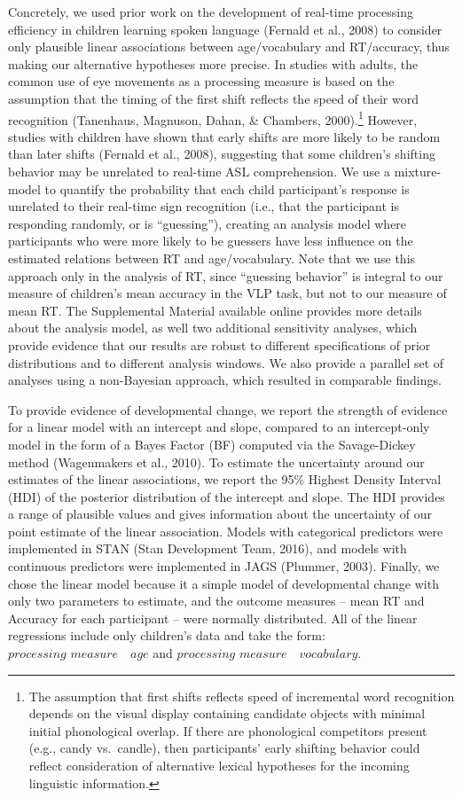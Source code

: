 \documentclass[oneside]{report}
\begin{document}
Concretely, we used prior work on the development of real-time
processing efficiency in children learning spoken language (Fernald et
al., 2008) to consider only plausible linear associations between
age/vocabulary and RT/accuracy, thus making our alternative hypotheses
more precise. In studies with adults, the common use of eye movements as
a processing measure is based on the assumption that the timing of the
first shift reflects the speed of their word recognition (Tanenhaus,
Magnuson, Dahan, \& Chambers, 2000).\footnote{The assumption that first
  shifts reflects speed of incremental word recognition depends on the
  visual display containing candidate objects with minimal initial
  phonological overlap. If there are phonological competitors present
  (e.g., candy vs.~candle), then participants' early shifting behavior
  could reflect consideration of alternative lexical hypotheses for the
  incoming linguistic information.} However, studies with children have
shown that early shifts are more likely to be random than later shifts
(Fernald et al., 2008), suggesting that some children's shifting
behavior may be unrelated to real-time ASL comprehension. We use a
mixture-model to quantify the probability that each child participant's
response is unrelated to their real-time sign recognition (i.e., that
the participant is responding randomly, or is ``guessing''), creating an
analysis model where participants who were more likely to be guessers
have less influence on the estimated relations between RT and
age/vocabulary. Note that we use this approach only in the analysis of
RT, since ``guessing behavior'' is integral to our measure of children's
mean accuracy in the VLP task, but not to our measure of mean RT. The
Supplemental Material available online provides more details about the
analysis model, as well two additional sensitivity analyses, which
provide evidence that our results are robust to different specifications
of prior distributions and to different analysis windows. We also
provide a parallel set of analyses using a non-Bayesian approach, which
resulted in comparable findings.

To provide evidence of developmental change, we report the strength of
evidence for a linear model with an intercept and slope, compared to an
intercept-only model in the form of a Bayes Factor (BF) computed via the
Savage-Dickey method (Wagenmakers et al., 2010). To estimate the
uncertainty around our estimates of the linear associations, we report
the 95\% Highest Density Interval (HDI) of the posterior distribution of
the intercept and slope. The HDI provides a range of plausible values
and gives information about the uncertainty of our point estimate of the
linear association. Models with categorical predictors were implemented
in STAN (Stan Development Team, 2016), and models with continuous
predictors were implemented in JAGS (Plummer, 2003). Finally, we chose
the linear model because it a simple model of developmental change with
only two parameters to estimate, and the outcome measures -- mean RT and
Accuracy for each participant -- were normally distributed. All of the
linear regressions include only children's data and take the form:
\(\textit{processing measure ~ age}\) and
\(\textit{processing measure ~ vocabulary}\).
\end{document}
